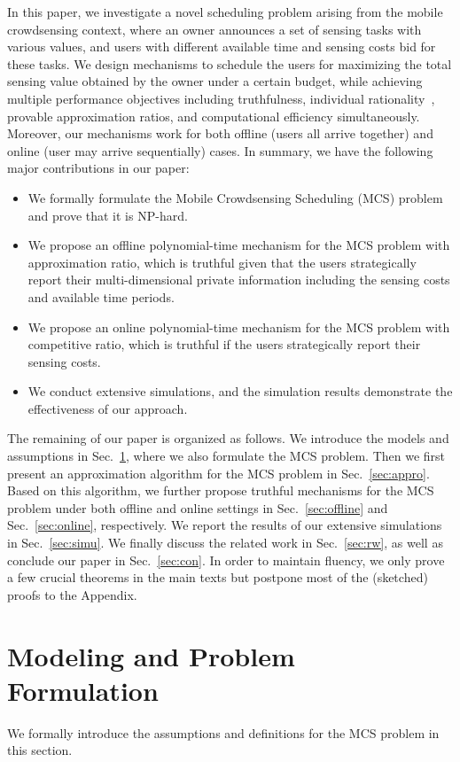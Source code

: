 \documentclass[10pt,journal,compsoc]{IEEEtran}
\begin{document}
  In this paper, we investigate a novel scheduling problem arising from the mobile crowdsensing context, where an owner announces a set of sensing tasks with various values, and users with different available time and sensing costs bid for these tasks. We design mechanisms to schedule the users for maximizing the total sensing value obtained by the owner under a certain budget, while achieving multiple performance objectives including truthfulness, individual rationality~\cite{Nisan2007}, provable approximation ratios, and computational efficiency simultaneously. Moreover, our mechanisms work for both offline (users all arrive together) and online (user may arrive sequentially) cases. In summary, we have the following major contributions in our paper:
\begin{itemize}
\item We formally formulate the Mobile Crowdsensing Scheduling (MCS) problem and prove that it is NP-hard.
\item We propose an offline polynomial-time mechanism for the MCS problem with  approximation ratio, which is truthful given that the users strategically report their multi-dimensional private information including the sensing costs and available time periods.
\item We propose an online polynomial-time mechanism for the MCS problem with  competitive ratio, which is truthful if the users strategically report their sensing costs.
\item We conduct extensive simulations, and the simulation results demonstrate the effectiveness of our approach.
\end{itemize}

  The remaining of our paper is organized as follows. We introduce the models and assumptions in Sec.~\ref{sec:model}, where we also formulate the MCS problem. Then we first present an approximation algorithm for the MCS problem in Sec.~\ref{sec:appro}. Based on this algorithm, we further propose truthful mechanisms for the MCS problem under both offline and online settings in Sec.~\ref{sec:offline} and Sec.~\ref{sec:online}, respectively. We report the results of our extensive simulations in Sec.~\ref{sec:simu}. We finally discuss the related work in Sec.~\ref{sec:rw}, as well as conclude our paper in Sec.~\ref{sec:con}. In order to maintain fluency, we only prove a few crucial theorems in the main texts but postpone most of the (sketched) proofs to the Appendix.


\section{Modeling and Problem Formulation} \label{sec:model}
We formally introduce the assumptions and definitions for the MCS problem in this section.
\end{document}
